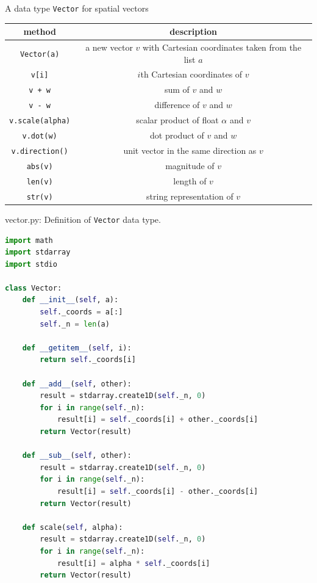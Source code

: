 \documentclass[8pt,a4paper,compress]{beamer}
\begin{document}
\begin{frame}[fragile]
\pause

A data type \lstinline{Vector} for spatial vectors
\begin{center}
\begin{tabular}{cc}
method & description \\ \hline
\lstinline$Vector(a)$ & a new vector $v$ with Cartesian coordinates taken from the list $a$ \\
\lstinline$v[i]$ & $i$th Cartesian coordinates of $v$ \\
\lstinline$v + w$ & sum of $v$ and $w$ \\
\lstinline$v - w$ & difference of $v$ and $w$ \\
\lstinline$v.scale(alpha)$ & scalar product of float $\alpha$ and $v$ \\
\lstinline$v.dot(w)$ & dot product of $v$ and $w$ \\
\lstinline$v.direction()$ & unit vector in the same direction as $v$ \\
\lstinline$abs(v)$ & magnitude of $v$ \\
\lstinline$len(v)$ & length of $v$ \\
\lstinline$str(v)$ & string representation of $v$
\end{tabular} 
\end{center}
\end{frame}

\begin{frame}[fragile]
\pause

\begin{framed}
\tiny vector.py: Definition of \lstinline{Vector} data type.
\end{framed}

\begin{lstlisting}[language=Python]
import math
import stdarray
import stdio

class Vector:
    def __init__(self, a):
        self._coords = a[:]
        self._n = len(a)

    def __getitem__(self, i):
        return self._coords[i]

    def __add__(self, other):
        result = stdarray.create1D(self._n, 0)
        for i in range(self._n):
            result[i] = self._coords[i] + other._coords[i]
        return Vector(result)

    def __sub__(self, other):
        result = stdarray.create1D(self._n, 0)
        for i in range(self._n):
            result[i] = self._coords[i] - other._coords[i]
        return Vector(result)

    def scale(self, alpha):
        result = stdarray.create1D(self._n, 0)
        for i in range(self._n):
            result[i] = alpha * self._coords[i]
        return Vector(result)
\end{lstlisting}
\end{frame}
\end{document}
